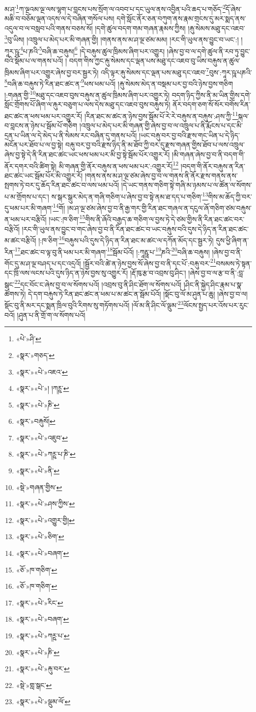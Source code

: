 མ་ཤ་\footnote{«པེ་»ཤི་}ཀ་ལྔའམ་ལྔ་ལས་ལྷག་པ་བླངས་པས་སྲོག་ལ་འབབ་པ་དང་ཡུལ་ནས་འབྱིན་པའི་ཆད་པ་གཅོད་\footnote{«སྣར་»གཅད་}དོ་ཞེས་མཆི་བ་བཅོམ་ལྡན་འདས་ལ་དེ་བཞིན་གསོལ་པས། དགེ་སློང་ནོར་ཅན་བཀུག་ནས་རྣམ་གྲངས་དུ་མར་སྨད་ནས་འདུལ་བ་ལ་བསླབ་པའི་གནས་བཅས་སོ། །དགེ་ཚུལ་བདག་གམ་གཞན་རྣམས་ཀྱིས། །རྐུ་སེམས་མཐུ་དང་འཇབ་\footnote{«སྣར་»«པེ་»འཇའ་}བུ་ཡིས། །འཁྲུལ་པ་མེད་པར་མི་གཞན་གྱི། །གནས་ནས་མ་ཤ་ལྔ་ཙམ་མམ། །རང་གི་ཡུལ་ནས་བྱུང་བ་ཡང་:། །ཀཱར་ཥཱ་\footnote{«སྣར་»«པེ་»། །ཀཪྵ་}པ་ཎའི་\footnote{«སྣར་»«པེ་»ཎི་}བཞི་ཆ་བརྐུས།\footnote{«སྣར་»བརྐུསོ།} །དེ་བརྐུས་ཚུལ་ཁྲིམས་ཞིག་པར་འགྱུར། །ཞེས་བྱ་བ་ལ་དགེ་ཚུལ་ནི་རབ་ཏུ་བྱུང་བའི་སྡོམ་པ་ལ་གནས་པའོ། །
བདག་གིས་ཀྱང་རྐུ་སེམས་དང་ལྡན་པས་མཐུ་དང་འཇབ་བུ་ཡིས་བརྐུས་ན་ཚུལ་ཁྲིམས་ཞིག་པར་འགྱུར་ཞེས་བྱ་བར་སྦྱར་ཏེ། འདི་ལྟར་རྐུ་སེམས་དང་ལྡན་པས་མཐུ་དང་འཇབ་\footnote{«སྣར་»«པེ་»འཇུབ་}བུས་:ཀཱར་ཥཱ་པཎའི་\footnote{«སྣར་»«པེ་»ཀཪྵ་པ་ཎི་}བཞི་ཆ་བརྐུས་ཏེ་རིན་ཐང་ཚང་ན་\footnote{«སྣར་»«པེ་»ནི་}ཕས་ཕམ་པའོ། །རྐུ་སེམས་མེད་ན་བསྡམ་པར་བྱ་བའི་ཉེས་བྱས་གཅིག །:གཞན་གྱི་\footnote{«སྡེ་»གཞན་གྱིས་}མཐུ་དང་འཇབ་བུས་བརྐུས་ན་ཚུལ་ཁྲིམས་ཞིག་པར་འགྱུར་ཏེ། བདག་ཉིད་ཀྱིས་ནི་མ་ཡིན་གྱིས་དགེ་སློང་གྲོགས་པོ་ཞིག་ལ་རྐུར་བཅུག་པ་ལས་དེས་མཐུ་དང་འཇབ་བུས་བརྐུས་ཏེ། ནོར་བདག་ཅག་སོ་སོར་བགོས་རིན་ཐང་ཚང་ན་ཕས་ཕམ་པར་འགྱུར་རོ། །རིན་ཐང་མ་ཚང་ན་ཉེས་བྱས་སྦོམ་པོ་རེ་རེ་བརྐུས་ན་བརྐུས་:ཤས་ཀྱི་\footnote{«སྣར་»«པེ་»ཤས་ཀྱིས་}སྐལ་བ་བླངས་ན་ཉེས་པ་སྦོམ་པོ་གཅིག །འཁྲུལ་པ་མེད་པར་མི་གཞན་གྱི་ཞེས་བྱ་བ་ལ་འཁྲུལ་པ་ནི་རྨོངས་པ་དང་མི་དྲན་པ་ཡིན་ལ་དེ་མེད་པ་ནི་སེམས་རང་བཞིན་དུ་གནས་པའོ། །ཡང་བརྐུ་བར་བྱ་བའི་རྫས་གང་ཡིན་པ་དེ་ཉིད་མངོན་པར་ཐོབ་པ་ལ་བྱ་སྟེ། བརྐུ་བར་བྱ་བའི་རྫས་ཉིད་ནི་མ་ཐོབ་ཀྱི་བར་དུ་རྫས་གཞན་གྱིས་ཐོབ་པ་ལས་འཁྲུལ་ཞེས་བྱ་སྟེ་དེ་ནི་རིན་ཐང་ཚང་ཡང་ཕས་ཕམ་པར་མི་བྱ་སྟེ་སྦོམ་པོར་འགྱུར་རོ། །མི་གཞན་ཞེས་བྱ་བ་ནི་བདག་གི་ནོར་དགར་བའི་ཚིག་སྟེ། མི་གཞན་གྱི་ནོར་བརྐུས་ན་ཕས་ཕམ་པར་:འགྱུར་རོ།\footnote{«སྣར་»«པེ་»འགྱུར་གྱི།} །བདག་གི་ནོར་བརྐུས་ན་རིན་ཐང་ཚང་ཡང་སྦོམ་པོར་མི་འགྱུར་རོ། །གནས་ནས་མ་ཤ་ལྔ་ཙམ་ཞེས་བྱ་བ་ལ་གནས་ནི་ནོར་རྫས་གནས་ནས་སྤགས་ཏེ་བར་དུ་ཆོད་རིན་ཐང་ཚང་བ་ལས་ཕམ་པའོ། །དེ་ཡང་གནས་གཅིག་སྟེ་གཞི་མ་ཉམས་པ་ལ་ཚོན་ལ་སོགས་པ་མ་གྲོགས་པ་དང་། ས་སྒར་སྒུར་མེད་ན་གཞི་གཅིག་པ་ཞེས་བྱ་བ་སྟེ་ནམ་ཐ་དད་པ་གཅིག་\footnote{«སྣར་»«པེ་»ཅིག་}གིས་མ་ཆོད་ཀྱི་བར་དུ་ཕམ་པར་མི་གཞག་\footnote{«སྣར་»«པེ་»བཞག་}གོ། །མ་ཤ་ལྔ་ཙམ་ཞེས་བྱ་བ་ནི་རྒྱ་གར་གྱི་རིན་ཐང་གཞལ་ན་དངུལ་ཞོ་གཅིག་ཙམ་བརྐུས་ན་ཕམ་པར་བརྩིའོ། །ཡང་:ཁ་ཅིག་\footnote{«ཅོ་»ཁ་གཅིག་}གིས་ནི་ཞོའི་བརྒྱད་ཆ་གཅིག་ལ་བྱས་ཏེ་དེ་ཙམ་གྱིས་ནི་རིན་ཐང་ཚང་བར་བརྩིའོ། །རང་གི་ཡུལ་ནས་བྱུང་བ་གང་ཞེས་བྱ་བ་ནི་རིན་ཐང་ཚང་བ་ཡང་བརྐུས་བའི་དུས་དེ་ཉིད་ན་རིན་ཐང་ཚང་མ་ཚང་བརྩིའོ། །:ཁ་ཅིག་\footnote{«ཅོ་»ཁ་གཅིག་}བརྐུས་པའི་དུས་དེ་ཉིད་ན་རིན་ཐང་མ་ཚང་ལ་དཀོན་མོད་དང་སྦྱར་ཏེ། དུས་ཕྱི་ཞིག་ན་རིན་\footnote{«སྣར་»«པེ་»རིང་}ཐང་ཚང་བ་ལྟ་བུ་ནི་ཕམ་པར་མི་གཞག་\footnote{«སྣར་»«པེ་»བཞག་}སྦོམ་པོའོ། །:ཀཱརྵཱ་པ་\footnote{«སྣར་»«པེ་»ཀཪྵ་པ་}ཎའི་\footnote{«སྣར་»«པེ་»ཎི་}བཞི་ཆ་བརྐུས། །ཞེས་བྱ་བ་ནི་གོང་དུ་མ་ཤ་ལྔ་བཤད་པ་དང་འདྲའོ། །སྦྱོར་བའི་ཚེ་ན་ཉེས་བྱས་སོ་ཞེས་བྱ་བ་ནི་དང་པོ་:བརྐུ་བར་\footnote{«སྣར་»«པེ་»རྐུ་བར་}བསམས་ཏེ་སྟན་དང་ཁྲི་ལས་ལངས་པའི་དུས་ཉིད་ན་ཉེས་བྱས་སུ་འགྱུར་རོ། །རྡོ་ཁུ་རྩ་བ་འབྲས་བུ་ཤིང་། །ཞེས་བྱ་བ་ལ་རྩ་བ་ནི་:བླ་སྒང་\footnote{«སྡེ་»གླ་སྒང་}དང་བོང་ང་ཞེས་བྱ་བ་ལ་སོགས་པའོ། །འབྲས་བུ་ནི་ཤིང་ཐོག་ལ་སོགས་པའོ། །ཤིང་ནི་སྐྱེད་ཤིང་རྣམ་པ་སྣ་ཚོགས་ཏེ། དེ་དག་བརྐུས་ཏེ་རིན་ཐང་ཚང་ན་ཕམ་པ་མ་ཚང་ན་སྦོམ་པོའོ། །སྡོང་བུ་ལོ་མ་ཤུན་པ་ཆུ། །ཞེས་བྱ་བ་ལ། སྡོང་བུ་ནི་མར་དང་སྨན་ཁྲིལ་བུའི་རིགས་སུ་གཏོགས་པའོ། །ལོ་མ་ནི་ཤིང་ལོ་ལྡུམ་\footnote{«སྣར་»«པེ་»ལྡུམ་ལོ་}ལོངས་སྤྱད་པར་འོས་པར་རུང་བའོ། །ཤུན་པ་ནི་གྲོ་ག་ལ་སོགས་པའོ། 
